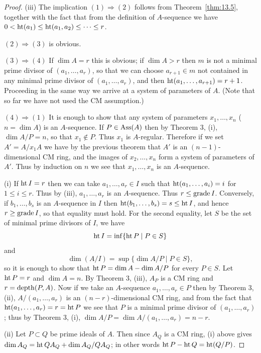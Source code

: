 \begin{proof}
(iii) The implication $(1) \Rightarrow (2)$ follows from Theorem~\ref{thm:13.5}, together with
the fact that from the definition of $A$-sequence we have $0 < \operatorname{ht}(a_1) \le
\operatorname{ht}(a_1, a_2) \le \cdots \le r$.

$(2) \Rightarrow (3)$ is obvious.

$(3) \Rightarrow (4)$ If $\dim A = r$ this is obvious; if $\dim A > r$ then $m$ is not a minimal
prime divisor of $(a_1, \ldots, a_r)$, so that we can choose $a_{r+1} \in m$ not contained
in any minimal prime divisor of $(a_1, \ldots, a_r)$, and then $\operatorname{ht}(a_1, \ldots, a_{r+1}) = r + 1$.
Proceeding in the same way we arrive at a system of parameters of $A$.
(Note that so far we have not used the CM assumption.)

$(4) \Rightarrow (1)$ It is enough to show that any system of parameters $x_1, \ldots, x_n$
($n = \dim A$) is an $A$-sequence. If $P \in \operatorname{Ass}(A)$ then by Theorem 3, (i),
$\dim A/P = n$, so that $x_1 \notin P$. Thus $x_1$ is $A$-regular. Therefore if we set
$A' = A/x_1A$ we have by the previous theorem that $A'$ is an $(n - 1)$-
dimensional CM ring, and the images of $x_2, \ldots, x_n$ form a system of
parameters of $A'$. Thus by induction on $n$ we see that $x_1, \ldots, x_n$ is an
$A$-sequence.

(i) If $\operatorname{ht} I = r$ then we can take $a_1, \ldots, a_r \in I$ such that $\operatorname{ht}(a_1, \ldots, a_i) = i$ for
$1 \le i \le r$. Thus by (iii), $a_1, \ldots, a_r$ is an $A$-sequence. Thus $r \le \operatorname{grade} I$.
Conversely, if $b_1, \ldots, b_s$ is an $A$-sequence in $I$ then $\operatorname{ht}(b_1, \ldots, b_s) = s \le \operatorname{ht} I$, and
hence $r \ge \operatorname{grade} I$, so that equality must hold. For the second equality, let
$S$ be the set of minimal prime divisors of $I$, we have
\[
  \operatorname{ht} I = \inf\{\operatorname{ht} P \mid P \in S\}
\]
and
\[
  \dim(A/I) = \sup\{\dim A/P \mid P \in S\},
\]
so it is enough to show that $\operatorname{ht} P = \dim A - \dim A/P$ for every $P \in S$.
Let $\operatorname{ht} P = r$ and $\dim A = n$. By Theorem 3, (iii), $A_P$ is a CM ring
and $r = \operatorname{depth}(P, A)$. Now if we take an $A$-sequence $a_1, \ldots, a_r \in P$ then
by Theorem 3, (ii), $A/(a_1, \ldots, a_r)$ is an $(n - r)$-dimensional CM ring, and from
the fact that $\operatorname{ht} (a_1, \ldots, a_r) = r = \operatorname{ht} P$ we see that $P$ is a minimal prime
divisor of $(a_1, \ldots, a_r)$; thus by Theorem 3, (i), $\dim A/P = \dim A/(a_1, \ldots, a_r) =
n - r$.

(ii) Let $P \subset Q$ be prime ideals of $A$. Then since $A_Q$ is a CM ring, (i)
above gives $\dim A_Q = \operatorname{ht} QA_Q + \dim A_Q/QA_Q$; in other words $\operatorname{ht} P - \operatorname{ht} Q =
\operatorname{ht} (Q/P)$.
\end{proof}

